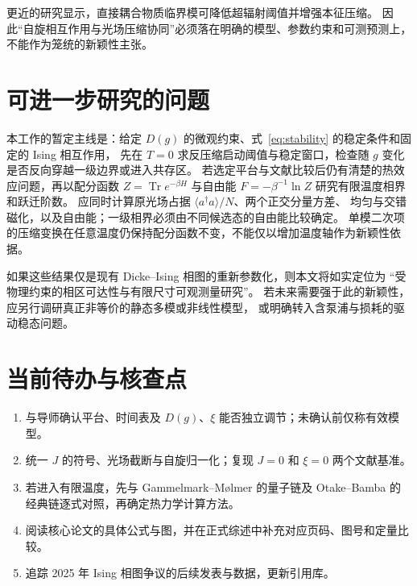 \documentclass[UTF8,11pt,a4paper]{ctexart}
\begin{document}
更近的研究显示，直接耦合物质临界模可降低超辐射阈值并增强本征压缩\cite{Sur2026Critical}。
因此“自旋相互作用与光场压缩协同”必须落在明确的模型、参数约束和可测预测上，不能作为笼统的新颖性主张。

\section{可进一步研究的问题}

本工作的暂定主线是：给定 $D(g)$ 的微观约束、式~\eqref{eq:stability} 的稳定条件和固定的 Ising 相互作用，
先在 $T=0$ 求反压缩启动阈值与稳定窗口，检查随 $g$ 变化是否反向穿越一级边界或进入共存区。
若选定平台与文献比较后仍有清楚的热效应问题，再以配分函数 $Z=\operatorname{Tr}e^{-\beta H}$ 与自由能
$F=-\beta^{-1}\ln Z$ 研究有限温度相界和跃迁阶数。
应同时计算原光场占据 $\langle a^\dagger a\rangle/N$、两个正交分量方差、
均匀与交错磁化，以及自由能；一级相界必须由不同候选态的自由能比较确定。
单模二次项的压缩变换在任意温度仍保持配分函数不变，不能仅以增加温度轴作为新颖性依据。

如果这些结果仅是现有 Dicke--Ising 相图的重新参数化，则本文将如实定位为
“受物理约束的相区可达性与有限尺寸可观测量研究”。
若未来需要强于此的新颖性，应另行调研真正非等价的静态多模或非线性模型，
或明确转入含泵浦与损耗的驱动稳态问题。

\section{当前待办与核查点}

\begin{enumerate}
  \item 与导师确认平台、时间表及 $D(g)$、$\xi$ 能否独立调节；未确认前仅称有效模型。
  \item 统一 $J$ 的符号、光场截断与自旋归一化；复现 $J=0$ 和 $\xi=0$ 两个文献基准。
  \item 若进入有限温度，先与 Gammelmark--Mølmer 的量子链及 Otake--Bamba 的经典链逐式对照，再确定热力学计算方法。
  \item 阅读核心论文的具体公式与图，并在正式综述中补充对应页码、图号和定量比较。
  \item 追踪 2025 年 Ising 相图争议的后续发表与数据，更新引用库。
\end{enumerate}

\printbibliography[title={参考文献}]
\end{document}
